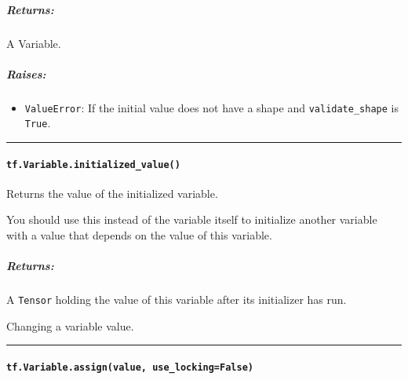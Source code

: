 \subparagraph{Returns: }\label{returns}

A Variable.

\subparagraph{Raises: }\label{raises}

\begin{itemize}
\tightlist
\item
  \lstinline{ValueError}: If the initial value does not have a shape and
  \lstinline{validate_shape} is \lstinline{True}.
\end{itemize}

\begin{center}\rule{0.5\linewidth}{\linethickness}\end{center}

\paragraph{\texorpdfstring{\lstinline{tf.Variable.initialized_value()}
}{tf.Variable.initialized_value() }}\label{tf.variable.initializedux5fvalue}

Returns the value of the initialized variable.

You should use this instead of the variable itself to initialize another
variable with a value that depends on the value of this variable.

\begin{Shaded}
\begin{Highlighting}[]
\OperatorTok{=} \NormalTok{tf.Variable(tf.truncated_normal([}\NormalTok{, }\NormalTok{]))}
\OperatorTok{=} \OperatorTok{*} \NormalTok{)}
\end{Highlighting}
\end{Shaded}

\subparagraph{Returns: }\label{returns-1}

A \lstinline{Tensor} holding the value of this variable after its
initializer has run.

Changing a variable value.

\begin{center}\rule{0.5\linewidth}{\linethickness}\end{center}

\paragraph{\texorpdfstring{\lstinline{tf.Variable.assign(value, use_locking=False)}
}{tf.Variable.assign(value, use_locking=False) }}\label{tf.variable.assignvalue-useux5flockingfalse}

